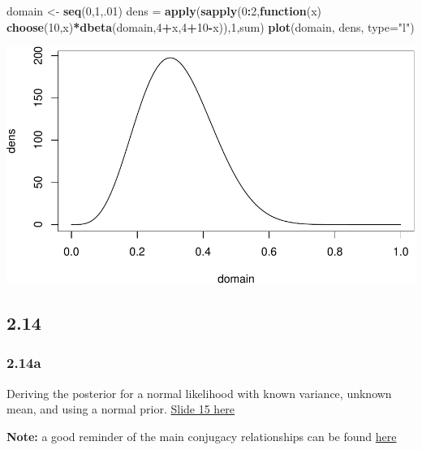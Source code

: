 \documentclass[]{article}
\newenvironment{Shaded}{\begin{snugshade}}{\end{snugshade}}
\newcommand{\KeywordTok}[1]{\textcolor[rgb]{0.13,0.29,0.53}{\textbf{#1}}}
\newcommand{\DataTypeTok}[1]{\textcolor[rgb]{0.13,0.29,0.53}{#1}}
\newcommand{\DecValTok}[1]{\textcolor[rgb]{0.00,0.00,0.81}{#1}}
\newcommand{\StringTok}[1]{\textcolor[rgb]{0.31,0.60,0.02}{#1}}
\newcommand{\ControlFlowTok}[1]{\textcolor[rgb]{0.13,0.29,0.53}{\textbf{#1}}}
\newcommand{\OperatorTok}[1]{\textcolor[rgb]{0.81,0.36,0.00}{\textbf{#1}}}
\newcommand{\NormalTok}[1]{#1}
\begin{document}
\begin{Shaded}
\begin{Highlighting}[]
\NormalTok{domain <-}\StringTok{ }\KeywordTok{seq}\NormalTok{(}\DecValTok{0}\NormalTok{,}\DecValTok{1}\NormalTok{,.}\DecValTok{01}\NormalTok{)}
\NormalTok{dens =}\StringTok{ }\KeywordTok{apply}\NormalTok{(}\KeywordTok{sapply}\NormalTok{(}\DecValTok{0}\OperatorTok{:}\DecValTok{2}\NormalTok{,}\ControlFlowTok{function}\NormalTok{(x) }\KeywordTok{choose}\NormalTok{(}\DecValTok{10}\NormalTok{,x)}\OperatorTok{*}\KeywordTok{dbeta}\NormalTok{(domain,}\DecValTok{4}\OperatorTok{+}\NormalTok{x,}\DecValTok{4}\OperatorTok{+}\DecValTok{10}\OperatorTok{-}\NormalTok{x)),}\DecValTok{1}\NormalTok{,sum)}
\KeywordTok{plot}\NormalTok{(domain, dens, }\DataTypeTok{type=}\StringTok{"l"}\NormalTok{)}
\end{Highlighting}
\end{Shaded}

\includegraphics{Untitled_files/figure-latex/unnamed-chunk-5-1.pdf}

\subsection{2.14}\label{section-2}

\subsubsection{2.14a}\label{a-1}

Deriving the posterior for a normal likelihood with known variance,
unknown mean, and using a normal prior.
\href{http://www.people.fas.harvard.edu/~plam/teaching/methods/conjugacy/conjugacy_print.pdf}{Slide
15 here}

\textbf{Note:} a good reminder of the main conjugacy relationships can
be found
\href{http://www.johndcook.com/conjugate_prior_diagram.html}{here}
\end{document}
